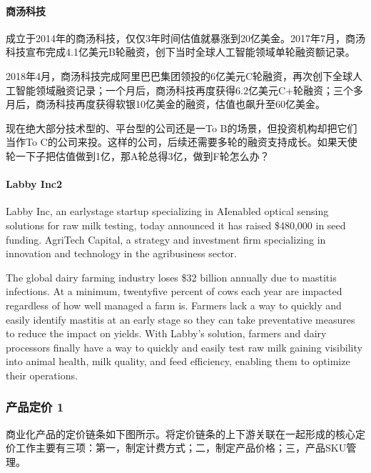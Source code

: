 \documentclass[letterpaper,11pt,english]{sphinxmanual}
\begin{document}
\paragraph{商汤科技}
\label{\detokenize{chapter_skill/Valuation:id4}}
成立于2014年的商汤科技，仅仅3年时间估值就暴涨到20亿美金。2017年7月，商汤科技宣布完成4.1亿美元B轮融资，创下当时全球人工智能领域单轮融资额记录。

2018年4月，商汤科技完成阿里巴巴集团领投的6亿美元C轮融资，再次创下全球人工智能领域融资记录；一个月后，商汤科技再度获得6.2亿美元C+轮融资；三个多月后，商汤科技再度获得软银10亿美金的融资，估值也飙升至60亿美金。

现在绝大部分技术型的、平台型的公司还是一To
B的场景，但投资机构却把它们当作To
C的公司来投。这样的公司，后续还需要多轮的融资支持成长。如果天使轮一下子把估值做到1亿，那A轮总得3亿，做到F轮怎么办？


\paragraph{Labby Inc2\sphinxfootnotemark[206]}
\label{\detokenize{chapter_skill/Valuation:labby-inc2}}%
\begin{footnotetext}[206]\sphinxAtStartFootnote
{}
%
\end{footnotetext}\ignorespaces 
Labby Inc, an early\sphinxhyphen{}stage startup specializing in AI\sphinxhyphen{}enabled optical
sensing solutions for raw milk testing, today announced it has raised
\$480,000 in seed funding. AgriTech Capital, a strategy and investment
firm specializing in innovation and technology in the agribusiness
sector.

The global dairy farming industry loses \$32 billion annually due to
mastitis infections. At a minimum, twenty\sphinxhyphen{}five percent of cows each year
are impacted regardless of how well managed a farm is. Farmers lack a
way to quickly and easily identify mastitis at an early stage so they
can take preventative measures to reduce the impact on yields. With
Labby’s solution, farmers and dairy processors finally have a way to
quickly and easily test raw milk gaining visibility into animal health,
milk quality, and feed efficiency, enabling them to optimize their
operations.


\subsubsection{产品定价 1\sphinxfootnotemark[207]}
\label{\detokenize{chapter_skill/price:id1}}\label{\detokenize{chapter_skill/price::doc}}%
\begin{footnotetext}[207]\sphinxAtStartFootnote
{}
%
\end{footnotetext}\ignorespaces 
商业化产品的定价链条如下图所示。将定价链条的上下游关联在一起形成的核心定价工作主要有三项：第一，制定计费方式；二，制定产品价格；三，产品SKU管理。
\end{document}
